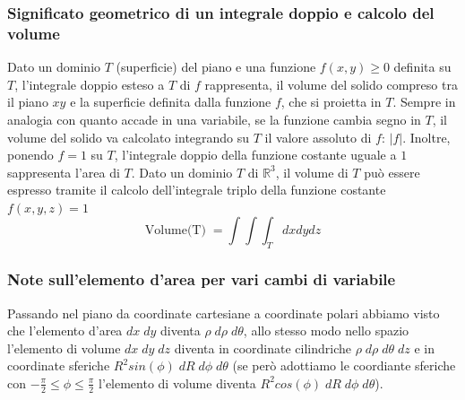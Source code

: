 \subsubsection{Significato geometrico di un integrale doppio e calcolo del volume}
Dato un dominio $T$ (superficie) del piano e una funzione $f(x,y) \geq 0$ definita su $T$, l'integrale doppio esteso a $T$ di $f$ rappresenta, il volume del solido compreso tra il piano $xy$ e la superficie definita dalla funzione $f$, che si proietta in $T$.\newline
\newline
Sempre in analogia con quanto accade in una variabile, se la funzione cambia segno in $T$, il volume del solido va calcolato integrando su $T$ il valore assoluto di $f$: $|f|$. Inoltre, ponendo $f = 1$ su $T$, l'integrale doppio della funzione costante uguale a $1$ sappresenta l'area di $T$.\newline
\newline
Dato un dominio $T$ di $\mathbb{R}^3$, il volume di $T$ può essere espresso  tramite il calcolo dell'integrale triplo della funzione costante $f(x,y,z) = 1$
\[
    \text{Volume(T)}\; = \int \int \int_{T} dx dy dz
\]
\subsubsection{Note sull'elemento d'area per vari cambi di variabile}
Passando nel piano da coordinate cartesiane a coordinate polari abbiamo visto che l'elemento d'area $dx \; dy$ diventa $\rho \; d \rho \;d \theta$, allo stesso modo nello spazio l'elemento di volume $dx \; dy \; dz$ diventa in coordinate cilindriche $\rho\; d \rho\; d \theta \; dz$ e in coordinate sferiche $R^2 sin(\phi)\; dR \;d \phi \;d \theta$ (se però adottiamo le coordiante sferiche con $-\frac{\pi}{2} \leq \phi \leq \frac{\pi}{2}$ l'elemento di volume diventa $R^2 cos(\phi) \;dR \;d \phi \;d \theta$).
